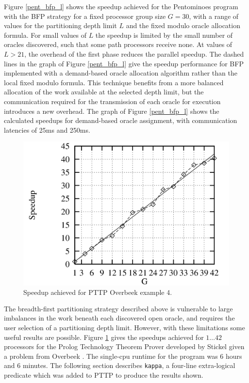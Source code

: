 \documentclass[a4paper,11pt,twoside]{article}
\begin{document}
Figure \ref{pent_bfp_l} shows the speedup achieved for the 
Pentominoes program with the BFP strategy for a fixed processor
group size $G=30$, with a range of values for the partitioning
depth limit $L$ and the fixed modulo oracle allocation formula.
For small values of $L$ the speedup is limited by the small number
of oracles discovered, such that some path processors receive none.
At values of $L>21$, the overhead of the first phase reduces the
parallel speedup.  The dashed lines in the graph of Figure \ref{pent_bfp_l}
give the
speedup performance for BFP implemented with a demand-based oracle
allocation algorithm rather than the local fixed modulo formula.
This technique benefits from a more balanced allocation of the
work available at the selected depth limit, but the communication
required for the transmission of each oracle for execution
introduces a new overhead.  The graph of Figure \ref{pent_bfp_l}
shows the calculated speedups for demand-based oracle assignment,
with communication latencies of
25ms and 250ms.

\begin{figure}
  \includegraphics[width=\linewidth]{overbeek_bfp.png}
  \caption{Speedup achieved for PTTP Overbeek example 4.}
  \label{overbeek_bfp}
\end{figure}

The breadth-first partitioning strategy described above is
vulnerable to large imbalances in the work beneath each discovered
open oracle, and requires the user selection of a partitioning depth
limit.  However, with these limitations some useful results are
possible.  Figure \ref{overbeek_bfp} gives the speedups achieved
for $1\ldots 42$ processors for the Prolog Technology Theorem
Prover developed by Stickel
given a problem from Overbeek \cite{Sti88}.  The single-cpu runtime for the
program was 6 hours and 6 minutes.  The following section
describes \texttt{kappa}, a four-line extra-logical predicate which
was added to PTTP to produce the results shown.
\end{document}
